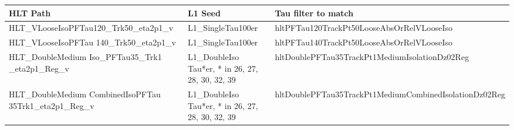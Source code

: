 {\footnotesize
\begin{tabular}{|p{3cm} p{2.5cm} p{8.9cm}|}
\hline
HLT Path & L1 Seed & Tau filter to match \\
\hline
HLT\_VLooseIsoPFTau120\_Trk50\_eta2p1\_v
&
L1\_SingleTau100er
&
hltPFTau120TrackPt50LooseAbsOrRelVLooseIso
\\
HLT\_VLooseIsoPFTau
140\_Trk50\_eta2p1\_v
&
L1\_SingleTau100er
&
hltPFTau140TrackPt50LooseAbsOrRelVLooseIso
\\
HLT\_DoubleMedium
Iso\_PFTau35\_Trk1
\_eta2p1\_Reg\_v
&
L1\_DoubleIso
Tau*er,
* in 26, 27, 28, 30, 32, 39
&
hltDoublePFTau35TrackPt1MediumIsolationDz02Reg
\\
HLT\_DoubleMedium
CombinedIsoPFTau
35Trk1\_eta2p1\_Reg\_v
&
L1\_DoubleIso
Tau*er,
* in 26, 27, 28, 30, 32, 39
&
hltDoublePFTau35TrackPt1MediumCombinedIsolationDz02Reg
\\
\hline
\end{tabular}
}